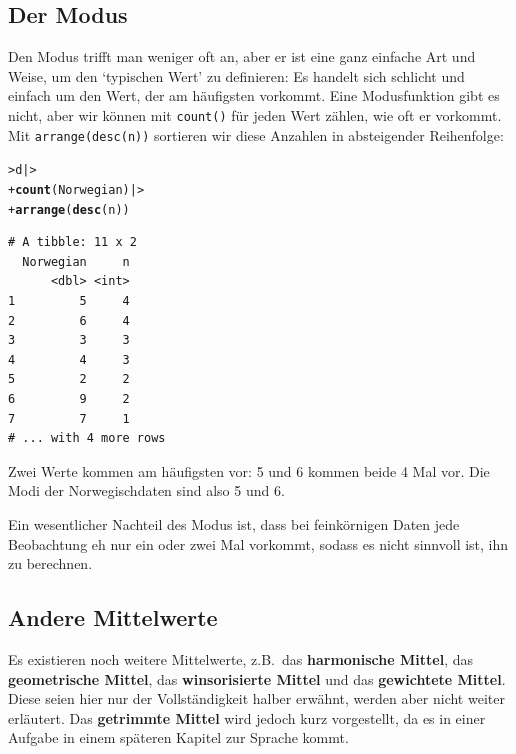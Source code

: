 \documentclass[oneside, 10pt]{book}\usepackage[]{graphicx}\usepackage[]{xcolor}
\makeatletter
\newcommand{\hlstd}[1]{\textcolor[rgb]{0.345,0.345,0.345}{#1}}%
\newcommand{\hlkwd}[1]{\textcolor[rgb]{0.737,0.353,0.396}{\textbf{#1}}}%
\newenvironment{kframe}{%
 \def\at@end@of@kframe{}%
 \ifinner\ifhmode%
  \def\at@end@of@kframe{\end{minipage}}%
  \begin{minipage}{\columnwidth}%
 \fi\fi%
 \def\FrameCommand##1{\hskip\@totalleftmargin \hskip-\fboxsep
 \colorbox{shadecolor}{##1}\hskip-\fboxsep
     \hskip-\linewidth \hskip-\@totalleftmargin \hskip\columnwidth}%
 \MakeFramed {\advance\hsize-\width
   \@totalleftmargin\z@ \linewidth\hsize
   \@setminipage}}%
 {\par\unskip\endMakeFramed%
 \at@end@of@kframe}
\newenvironment{knitrout}{}{} %
\makeatother
\begin{document}
\subsection{Der Modus}
Den Modus trifft man weniger oft an, aber er ist eine ganz einfache
Art und Weise, um den `typischen Wert' zu definieren: Es handelt
sich schlicht und einfach um den Wert, der am häufigsten vorkommt.
Eine Modusfunktion gibt es nicht, aber wir können mit \texttt{count()} für jeden Wert
zählen, wie oft er vorkommt. Mit \texttt{arrange(desc(n))} sortieren
wir diese Anzahlen in absteigender Reihenfolge:
\begin{knitrout}
\color{fgcolor}\begin{kframe}
\begin{alltt}
\hlstd{> }\hlstd{d |>}
\hlstd{+ }  \hlkwd{count}\hlstd{(Norwegian) |>}
\hlstd{+ }  \hlkwd{arrange}\hlstd{(}\hlkwd{desc}\hlstd{(n))}
\end{alltt}
\begin{verbatim}
# A tibble: 11 x 2
  Norwegian     n
      <dbl> <int>
1         5     4
2         6     4
3         3     3
4         4     3
5         2     2
6         9     2
7         7     1
# ... with 4 more rows
\end{verbatim}
\end{kframe}
\end{knitrout}
Zwei Werte kommen am häufigsten vor: 5 und 6 kommen beide 4 Mal vor. Die Modi der Norwegischdaten sind also 5 und 6.

Ein wesentlicher Nachteil des Modus ist, dass bei feinkörnigen
Daten jede Beobachtung
eh nur ein oder zwei Mal vorkommt, sodass es nicht sinnvoll ist,
ihn zu berechnen.

\subsection{Andere Mittelwerte}
Es existieren noch weitere Mittelwerte,
z.B.\ das \textbf{harmonische Mittel},
das \textbf{geometrische Mittel},
das \textbf{winsorisierte Mittel}
und das \textbf{gewichtete Mittel}.
Diese seien hier nur der Vollständigkeit halber erwähnt,
werden aber nicht weiter erläutert.
Das \textbf{getrimmte Mittel} wird jedoch kurz vorgestellt,
da es in einer Aufgabe in einem späteren Kapitel zur Sprache
kommt.
\end{document}
